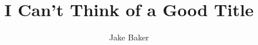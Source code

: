 \documentclass[a4paper]{article}
\begin{document}
\title{I Can't Think of a Good Title}
\author{Jake Baker}

\maketitle
{}
\thispagestyle{empty}




\pagestyle{fancy}
\cfoot{\thepage}
\tableofcontents
\clearpage
\setcounter{page}{1}







\printbibliography
\end{document}
